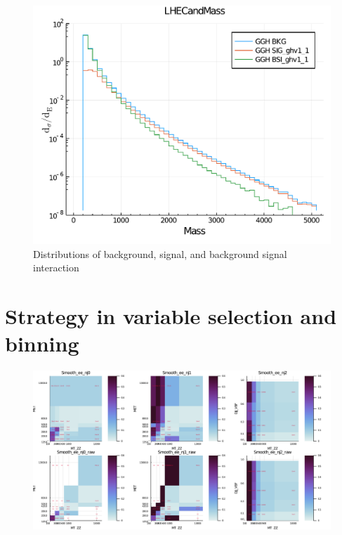 \begin{figure}[htb]
\begin{center}
\includegraphics[width=.8\linewidth]{fig/LHE_integral_difference.pdf}
\end{center}
\caption{Distributions of background, signal, and background signal interaction}
\label{fig:bsi_sig_bkg_compare}
\end{figure}


\section{Strategy in variable selection and binning}
\begin{figure}[htb]
\begin{center}
\includegraphics[width=.90\linewidth]{fig/binning_placeholder.png}
\end{center}
\label{fig:sig_rewgt}
\end{figure}
